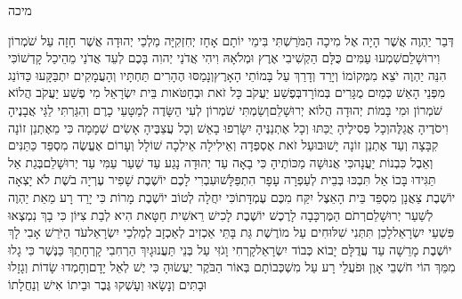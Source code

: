 \documentclass[../main/main.tex]{subfiles}
\begin{document}
\Incipit{}מיכה\par
\vspace{\afterchapskip}
\RTLmulticolcolumns
\begin{multicols}{\ncols}
דְּבַר יַהְוֶה אֲשֶׁר הָיָה אֶל מִיכָה הַמֹּרַשְׁתִּי בִּימֵי יוֹתָם אָחָז יְחִזְקִיָּה מַלְכֵי יְהוּדָה אֲשֶׁר חָזָה עַל שֹׁמְרוֹן וִירוּשָׁלֵם\PreVerseSpace{}שִׁמְעוּ עַמִּים כֻּלָּם הַקְשִׁיבִי אֶרֶץ וּמְלֹאָהּ וִיהִי אֲדֹנַי יְהוִה בָּכֶם לְעֵד אֲדֹנַי מֵהֵיכַל קָדְשׁוֹ\PreVerseSpace{}כִּי הִנֵּה יַהְוֶה יֹצֵא מִמְּקוֹמוֹ וְיָרַד וְדָרַךְ עַל בָּמוֹתֵי הָאָרֶץ\SubEnd{}\PreVerseSpace{}וְנָמַסּוּ הֶהָרִים תַּחְתָּיו וְהָעֲמָקִים יִתְבַּקָּעוּ כַּדּוֹנַג מִפְּנֵי הָאֵשׁ כְּמַיִם מֻגָּרִים בְּמוֹרָד\PreVerseSpace{}בְּפֶשַׁע יַעֲקֹב כָּל זֹאת וּבְחַטֹּאות בֵּית יִשְׂרָאֵל מִי פֶשַׁע יַעֲקֹב הֲלוֹא שֹׁמְרוֹן וּמִי בָּמוֹת יְהוּדָה הֲלוֹא יְרוּשָׁלֵם\PreVerseSpace{}וְשַׂמְתִּי שֹׁמְרוֹן לְעִי הַשָּׂדֶה לְמַטָּעֵי כָרֶם וְהִגַּרְתִּי לַגַּי אֲבָנֶיהָ וִיסֹדֶיהָ אֲגַלֶּה\PreVerseSpace{}וְכָל פְּסִילֶיהָ יֻכַּתּוּ וְכָל אֶתְנַנֶּיהָ יִשָּׂרְפוּ בָאֵשׁ וְכָל עֲצַבֶּיהָ אָשִׂים שְׁמָמָה כִּי מֵאֶתְנַן זוֹנָה קִבָּצָה וְעַד אֶתְנַן זוֹנָה יָשׁוּבוּ\PreVerseSpace{}עַל זֹאת אֶסְפְּדָה וְאֵילִילָה אֵילְכָה שׁוֹלָל\SubEnd{} וְעָרוֹם אֶעֱשֶׂה מִסְפֵּד כַּתַּנִּים וְאֵבֶל כִּבְנוֹת יַעֲנָה\PreVerseSpace{}כִּי אֲנוּשָׁה מַכּוֹתֶיהָ כִּי בָאָה עַד יְהוּדָה נָגַע עַד שַׁעַר עַמִּי עַד יְרוּשָׁלֵם\PreVerseSpace{}בְּגַת אַל תַּגִּידוּ בָּכוֹ אַל תִּבְכּוּ בְּבֵית לְעַפְרָה עָפָר הִתְפַּלָּשׁוּ\SubEnd{}\PreVerseSpace{}עִבְרִי לָכֶם יוֹשֶׁבֶת שָׁפִיר עֶרְיָה בֹשֶׁת לֹא יָצְאָה יוֹשֶׁבֶת צַאֲנָן מִסְפֵּד\SubEnd{} בֵּית הָאֵצֶל יִקַּח מִכֶּם עֶמְדָּתוֹ\PreVerseSpace{}כִּי יִחֲלָה\SubEnd{} לְטוֹב יוֹשֶׁבֶת מָרוֹת כִּי יָרַד רָע מֵאֵת יַהְוֶה לְשַׁעַר יְרוּשָׁלֵם\PreVerseSpace{}רְתֹם הַמֶּרְכָּבָה לָרֶכֶשׁ יוֹשֶׁבֶת לָכִישׁ רֵאשִׁית חַטָּאת הִיא לְבַת צִיּוֹן כִּי בָךְ נִמְצְאוּ פִּשְׁעֵי יִשְׂרָאֵל\PreVerseSpace{}לָכֵן תִּתְּנִי שִׁלּוּחִים עַל מוֹרֶשֶׁת גַּת בָּתֵּי אַכְזִיב לְאַכְזָב לְמַלְכֵי יִשְׂרָאֵל\PreVerseSpace{}עֹד הַיֹּרֵשׁ אָבִי לָךְ יוֹשֶׁבֶת מָרֵשָׁה עַד עֲדֻלָּם יָבוֹא כְּבוֹד יִשְׂרָאֵל\PreVerseSpace{}קָרְחִי וָגֹזִּי עַל בְּנֵי תַּעֲנוּגָיִךְ הַרְחִבִי קָרְחָתֵךְ כַּנֶּשֶׁר כִּי גָלוּ מִמֵּךְ \ClosedSection{}הוֹי חֹשְׁבֵי אָוֶן וּפֹעֲלֵי רָע עַל מִשְׁכְּבוֹתָם בְּאוֹר הַבֹּקֶר יַעֲשׂוּהָ כִּי יֶשׁ לְאֵל יָדָם\PreVerseSpace{}וְחָמְדוּ שָׂדוֹת וְגָזָלוּ וּבָתִּים וְנָשָׂאוּ וְעָשְׁקוּ גֶּבֶר וּבֵיתוֹ אִישׁ\SubEnd{} וְנַחֲלָתוֹ\OpenSection{}\par

\end{multicols}
\end{document}
